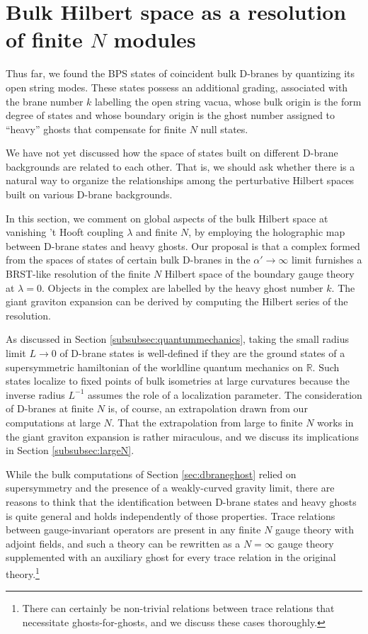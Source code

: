 \documentclass[a4paper,12pt]{article}
\begin{document}
\section{Bulk Hilbert space as a resolution of finite $N$ modules} \label{sec:bulkhilbertspace}

Thus far, we found the BPS states of coincident bulk D-branes by quantizing its open string modes. These states possess an additional grading, associated with the brane number $k$ labelling the open string vacua, whose bulk origin is the form degree of states and whose boundary origin is the ghost number assigned to ``heavy'' ghosts that compensate for finite $N$ null states.

We have not yet discussed how the space of states built on different D-brane backgrounds are related to each other. That is, we should ask whether there is a natural way to organize the relationships among the perturbative Hilbert spaces built on various D-brane backgrounds.

In this section, we comment on global aspects of the bulk Hilbert space at vanishing 't Hooft coupling $\lambda$ and finite $N$, by employing the holographic map between D-brane states and heavy ghosts. Our proposal is that a complex formed from the spaces of states of certain bulk D-branes in the $\alpha' \to \infty$ limit furnishes a BRST-like resolution of the finite $N$ Hilbert space of the boundary gauge theory at $\lambda = 0$. Objects in the complex are labelled by the heavy ghost number $k$. The giant graviton expansion can be derived by computing the Hilbert series of the resolution.

As discussed in Section \ref{subsubsec:quantummechanics}, taking the small radius limit $L \to 0$ of D-brane states is well-defined if they are the ground states of a supersymmetric hamiltonian of the worldline quantum mechanics on $\mathbb{R}$. Such states localize to fixed points of bulk isometries at large curvatures because the inverse radius $L^{-1}$ assumes the role of a localization parameter. The consideration of D-branes at finite $N$ is, of course, an extrapolation drawn from our computations at large $N$. That the extrapolation from large to finite $N$ works in the giant graviton expansion is rather miraculous, and we discuss its implications in Section \ref{subsubsec:largeN}.

While the bulk computations of Section \ref{sec:dbraneghost} relied on supersymmetry and the presence of a weakly-curved gravity limit, there are reasons to think that the identification between D-brane states and heavy ghosts is quite general and holds independently of those properties. Trace relations between gauge-invariant operators are present in any finite $N$ gauge theory with adjoint fields, and such a theory can be rewritten as a $N=\infty$ gauge theory supplemented with an auxiliary ghost for every trace relation in the original theory.\footnote{There can certainly be non-trivial relations between trace relations that necessitate ghosts-for-ghosts, and we discuss these cases thoroughly.}
\end{document}

